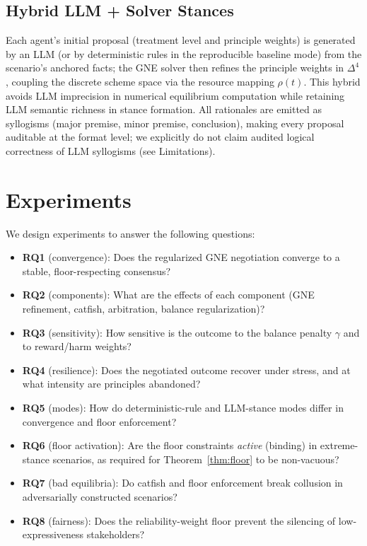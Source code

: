 \documentclass[11pt]{article}
\begin{document}
\subsection{Hybrid LLM + Solver Stances}
Each agent's initial proposal (treatment level and principle weights) is
generated by an LLM (or by deterministic rules in the reproducible baseline
mode) from the scenario's anchored facts; the GNE solver then refines the
principle weights in $\Delta^4$, coupling the discrete scheme space via the
resource mapping $\rho(t)$. This hybrid avoids LLM imprecision in numerical
equilibrium computation while retaining LLM semantic richness in stance
formation. All rationales are emitted as syllogisms (major premise, minor
premise, conclusion), making every proposal auditable at the format level;
we explicitly do not claim audited logical correctness of LLM syllogisms
(see Limitations).

\section{Experiments}
We design experiments to answer the following questions:
\begin{itemize}
  \item \textbf{RQ1} (convergence): Does the regularized GNE negotiation
  converge to a stable, floor-respecting consensus?
  \item \textbf{RQ2} (components): What are the effects of each component
  (GNE refinement, catfish, arbitration, balance regularization)?
  \item \textbf{RQ3} (sensitivity): How sensitive is the outcome to the
  balance penalty $\gamma$ and to reward/harm weights?
  \item \textbf{RQ4} (resilience): Does the negotiated outcome recover under
  stress, and at what intensity are principles abandoned?
  \item \textbf{RQ5} (modes): How do deterministic-rule and LLM-stance modes
  differ in convergence and floor enforcement?
  \item \textbf{RQ6} (floor activation): Are the floor constraints
  \emph{active} (binding) in extreme-stance scenarios, as required for
  Theorem~\ref{thm:floor} to be non-vacuous?
  \item \textbf{RQ7} (bad equilibria): Do catfish and floor enforcement
  break collusion in adversarially constructed scenarios?
  \item \textbf{RQ8} (fairness): Does the reliability-weight floor prevent
  the silencing of low-expressiveness stakeholders?
\end{itemize}
\end{document}
